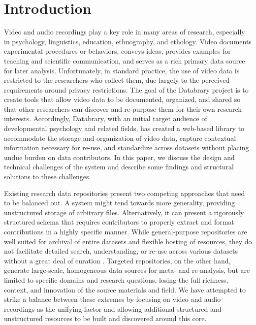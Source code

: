 \documentclass{sig-alternate}
\begin{document}


\section{Introduction}

Video and audio recordings play a key role in many areas of research, especially in psychology, linguistics, education, ethnography, and ethology.
Video documents experimental procedures or behaviors, conveys ideas, provides examples for teaching and scientific communication, and serves as a rich primary data source for later analysis.
Unfortunately, in standard practice, the use of video data is restricted to the researchers who collect them, due largely to the perceived requirements around privacy restrictions.
The goal of the Databrary project is to create tools that allow video data to be documented, organized, and shared so that other researchers can discover and re-purpose them for their own research interests.
Accordingly, Databrary, with an initial target audience of developmental psychology and related fields, has created a web-based library to accommodate the storage and organization of video data, capture contextual information necessary for re-use, and standardize across datasets without placing undue burden on data contributors.
In this paper, we discuss the design and technical challenges of the system and describe some findings and structural solutions to these challenges.

Existing research data repositories present two competing approaches that need to be balanced out.
A system might tend towards more generality, providing unstructured storage of arbitrary files.
Alternatively, it can present a rigorously structured schema that requires contributors to properly extract and format contributions in a highly specific manner.
While general-purpose repositories are well suited for archival of entire datasets and flexible hosting of resources, they do not facilitate detailed search, understanding, or re-use across various datasets without a great deal of curation \cite{Peer_2012}.
Targeted repositories, on the other hand, generate large-scale, homogeneous data sources for meta- and re-analysis, but are limited to specific domains and research questions, losing the full richness, context, and innovation of the source materials and field.
We have attempted to strike a balance between these extremes by focusing on video and audio recordings as the unifying factor and allowing additional structured and unstructured resources to be built and discovered around this core.
\end{document}
